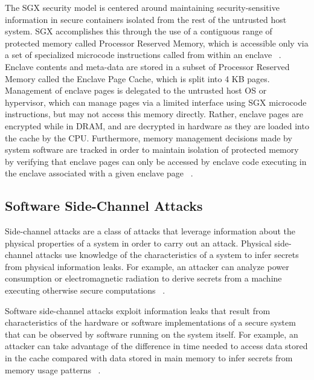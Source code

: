 The SGX security model is centered around maintaining security-sensitive information in secure containers isolated from the rest of the untrusted host system. SGX accomplishes this through the use of a contiguous range of protected memory called Processor Reserved Memory, which is accessible only via a set of specialized microcode instructions called from within an enclave ~\cite{costan_intel_2016}. Enclave contents and meta-data are stored in a subset of Processor Reserved Memory called the Enclave Page Cache, which is split into 4 KB pages. Management of enclave pages is delegated to the untrusted host OS or hypervisor, which can manage pages via a limited interface using SGX microcode instructions, but may not access this memory directly. Rather, enclave pages are encrypted while in DRAM, and are decrypted in hardware as they are loaded into the cache by the CPU. Furthermore, memory management decisions made by system software are tracked in order to maintain isolation of protected memory by verifying that enclave pages can only be accessed by enclave code executing in the enclave associated with a given enclave page ~\cite{intel_corporation_intel_2016, costan_intel_2016, moghimi_cachezoom:_2017}. 

\subsection{Software Side-Channel Attacks}

Side-channel attacks are a class of attacks that leverage information about the physical properties of a system in order to carry out an attack. Physical side-channel attacks use knowledge of the characteristics of a system to infer secrets from physical information leaks. For example, an attacker can analyze power consumption or electromagnetic radiation to derive secrets from a machine executing otherwise secure computations ~\cite{standaert_introduction_2010}. 

Software side-channel attacks exploit information leaks that result from characteristics of the hardware or software implementations of a secure system that can be observed by software running on the system itself. For example, an attacker can take advantage of the difference in time needed to access data stored in the cache compared with data stored in main memory to infer secrets from memory usage patterns ~\cite{costan_intel_2016}. 

